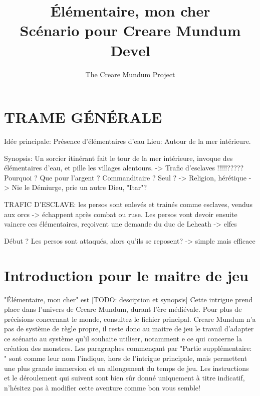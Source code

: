 \documentclass[a4paper]{article}
\title{Élémentaire, mon cher\\ Scénario pour Creare Mundum \\ Devel}
\author{The Creare Mundum Project}
\date{\oldstylenums{\insertdate}}
\begin{document}
\maketitle
\setcounter{tocdepth}{1} %
\renewcommand{\contentsname}{Sommaire} 
\tableofcontents
\newpage

\section*{TRAME GÉNÉRALE}
Idée principale: Présence d'élémentaires d'eau
Lieu: Autour de la mer intérieure.

Synopsis: Un sorcier itinérant fait le tour de la mer intérieure, invoque des élémentaires d'eau, et pille les villages alentours. -> Trafic d'esclaves !!!!!?????
Pourquoi ? Que pour l'argent ? Commanditaire ? Seul ?
-> Religion, hérétique -> Nie le Démiurge, prie un autre Dieu, "Itar"?

TRAFIC D'ESCLAVE: les persos sont enlevés et trainés comme esclaves, vendus aux orcs -> échappent après combat ou ruse.
\newline
Les persos vont devoir ensuite vaincre ces élémentaires, reçoivent une demande du duc de Leheath -> elfes

Début ? Les persos sont attaqués, alors qu'ils se reposent? -> simple mais efficace


\section{Introduction pour le maitre de jeu}
"Élémentaire, mon cher" est [TODO: desciption et synopsis]
\newline
Cette intrigue prend place dans l'univers de Creare Mundum, durant l'ère médiévale. Pour plus de précisions concernant le monde, consultez le fichier principal.
\newline
Creare Mundum n'a pas de système de règle propre, il reste donc au maitre de jeu le travail d'adapter ce scénario au système qu'il souhaite utiliser, notamment e ce qui concerne la création des monstres.
\newline
Les paragraphes commençant par "Partie supplémentaire: " sont comme leur nom l'indique, hors de l'intrigue principale, mais permettent une plus grande immersion et un allongement du temps de jeu.
\newline
Les instructions et le déroulement qui suivent sont bien sûr donné uniquement à titre indicatif, n'hésitez pas à modifier cette aventure comme bon vous semble!
\end{document}

